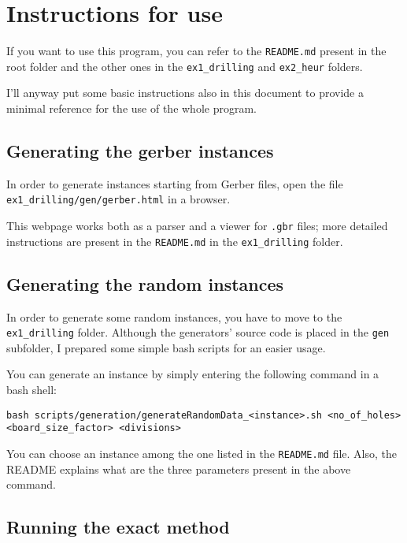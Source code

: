 \section{Instructions for use}\label{sec:instructions}

If you want to use this program, you can refer to the \texttt{README.md} present
in the root folder and the other ones in the \texttt{ex1\_drilling} and
\texttt{ex2\_heur} folders.

I'll anyway put some basic instructions also in this document to provide a
minimal reference for the use of the whole program.

\subsection{Generating the gerber instances}

In order to generate instances starting from Gerber files, open the file
\texttt{ex1\_drilling/gen/gerber.html} in a browser.

This webpage works both as a parser and a viewer for \texttt{.gbr} files; more
detailed instructions are present in the \texttt{README.md} in the
\texttt{ex1\_drilling} folder.

\subsection{Generating the random instances}

In order to generate some random instances, you have to move to the
\texttt{ex1\_drilling} folder. Although the generators' source code is placed
in the \texttt{gen} subfolder, I prepared some simple bash scripts for an easier
usage.

You can generate an instance by simply entering the following command in a bash
shell:

\begin{verbatim}
bash scripts/generation/generateRandomData_<instance>.sh <no_of_holes> <board_size_factor> <divisions>
\end{verbatim}

You can choose an instance among the one listed in the \texttt{README.md} file.
Also, the README explains what are the three parameters present in the above
command.

\subsection{Running the exact method}

